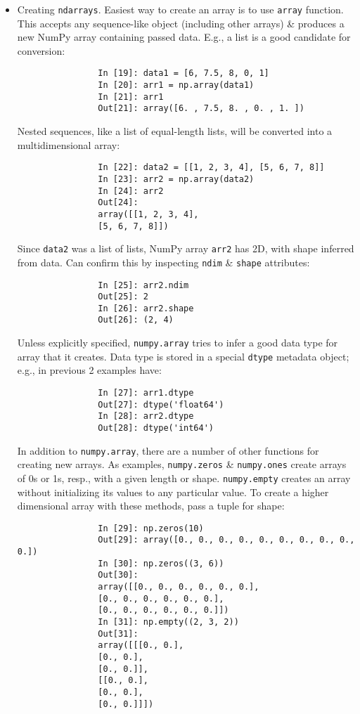 \documentclass{article}
\begin{document}
\begin{itemize}
\begin{itemize}
		\begin{itemize}
			\item {\sf Creating {\tt ndarrays}.} Easiest way to create an array is to use {\tt array} function. This accepts any sequence-like object (including other arrays) \& produces a new NumPy array containing passed data. E.g., a list is a good candidate for conversion:
			\begin{verbatim}
				In [19]: data1 = [6, 7.5, 8, 0, 1]
				In [20]: arr1 = np.array(data1)
				In [21]: arr1
				Out[21]: array([6. , 7.5, 8. , 0. , 1. ])
			\end{verbatim}
			Nested sequences, like a list of equal-length lists, will be converted into a multidimensional array:
			\begin{verbatim}
				In [22]: data2 = [[1, 2, 3, 4], [5, 6, 7, 8]]
				In [23]: arr2 = np.array(data2)
				In [24]: arr2
				Out[24]:
				array([[1, 2, 3, 4],
				[5, 6, 7, 8]])
			\end{verbatim}
			Since {\tt data2} was a list of lists, NumPy array {\tt arr2} has 2D, with shape inferred from data. Can confirm this by inspecting {\tt ndim} \& {\tt shape} attributes:
			\begin{verbatim}
				In [25]: arr2.ndim
				Out[25]: 2
				In [26]: arr2.shape
				Out[26]: (2, 4)
			\end{verbatim}
			Unless explicitly specified, {\tt numpy.array} tries to infer a good data type for array that it creates. Data type is stored in a special {\tt dtype} metadata object; e.g., in previous 2 examples have:
			\begin{verbatim}
				In [27]: arr1.dtype
				Out[27]: dtype('float64')
				In [28]: arr2.dtype
				Out[28]: dtype('int64')
			\end{verbatim}
			In addition to {\tt numpy.array}, there are a number of other functions for creating new arrays. As examples, {\tt numpy.zeros} \& {\tt numpy.ones} create arrays of 0s or 1s, resp., with a given length or shape. {\tt numpy.empty} creates an array without initializing its values to any particular value. To create a higher dimensional array with these methods, pass a tuple for shape:
			\begin{verbatim}
				In [29]: np.zeros(10)
				Out[29]: array([0., 0., 0., 0., 0., 0., 0., 0., 0., 0.])
				In [30]: np.zeros((3, 6))
				Out[30]:
				array([[0., 0., 0., 0., 0., 0.],
				[0., 0., 0., 0., 0., 0.],
				[0., 0., 0., 0., 0., 0.]])
				In [31]: np.empty((2, 3, 2))
				Out[31]:
				array([[[0., 0.],
				[0., 0.],
				[0., 0.]],
				[[0., 0.],
				[0., 0.],
				[0., 0.]]])
			\end{verbatim}
			

\end{itemize}
\end{itemize}
\end{itemize}
\end{document}
